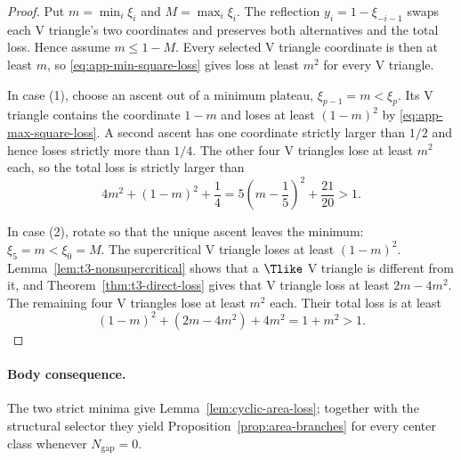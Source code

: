 \begin{proof}
Put $m=\min_i \xi_i$ and $M=\max_i \xi_i$.  The reflection
$y_i=1-\xi_{-i-1}$ swaps each V triangle's two coordinates and preserves both
alternatives and the total loss.  Hence assume $m\le1-M$.  Every selected
V triangle coordinate is then at least $m$, so
\eqref{eq:app-min-square-loss} gives loss at least $m^2$ for every V triangle.

In case (1), choose an ascent out of a minimum plateau,
$\xi_{p-1}=m<\xi_p$.  Its V triangle contains the coordinate $1-m$ and loses at least
$(1-m)^2$ by \eqref{eq:app-max-square-loss}.  A second ascent has one coordinate
strictly larger than $1/2$ and hence loses strictly more than $1/4$.  The
other four V triangles lose at least $m^2$ each, so the total loss is strictly
larger than
\[
 4m^2+(1-m)^2+\frac14
 =5\left(m-\frac15\right)^2+\frac{21}{20}>1.
\]

In case (2), rotate so that the unique ascent leaves the minimum:
$\xi_5=m<\xi_0=M$.  The supercritical V triangle loses at least $(1-m)^2$.
Lemma~\ref{lem:t3-nonsupercritical} shows that a $\Tlike$ V triangle is different
from it, and Theorem~\ref{thm:t3-direct-loss} gives that V triangle loss at least
$2m-4m^2$.  The remaining four V triangles lose at least $m^2$ each.  Their total
loss is at least
\[
 (1-m)^2+(2m-4m^2)+4m^2=1+m^2>1.
\]
\end{proof}

\paragraph{Body consequence.}
The two strict minima give Lemma~\ref{lem:cyclic-area-loss}; together with
the structural selector they yield Proposition~\ref{prop:area-branches} for
every center class whenever $N_{\mathrm{gap}}=0$.
